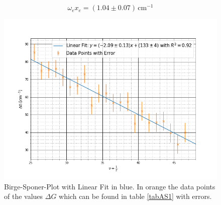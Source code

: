 \begin{equation*}
\omega_ex_e = (1.04\pm 0.07)\,\text{cm}^{-1}
\end{equation*}
\begin{figure}[ht]
	\includegraphics[scale=0.5]{Bild/AS_3}
	\centering
	\caption[Birge-Sponer-Plot with Linear Fit]{\small Birge-Sponer-Plot with Linear Fit in blue. In orange the data points of the values $\Delta G$ which can be found in table \ref{tabAS1} with errors.}
	\label{figAS3}
\end{figure}
